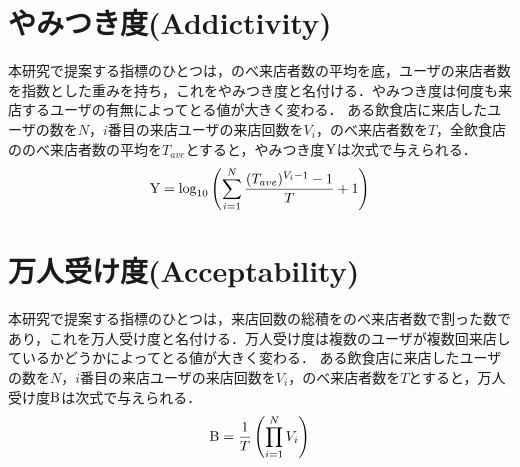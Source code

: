 \section{やみつき度(Addictivity)}

本研究で提案する指標のひとつは，のべ来店者数の平均を底，ユーザの来店者数を指数とした重みを持ち，これをやみつき度と名付ける．やみつき度は何度も来店するユーザの有無によってとる値が大きく変わる．
ある飲食店に来店したユーザの数を$N$，$i$番目の来店ユーザの来店回数を$V_i$，のべ来店者数を$T$，全飲食店ののべ来店者数の平均を$T_{ave}$とすると，やみつき度$\rm Y$は次式で与えられる．
\begin{equation}
	{\rm Y} = \log_{10}{\left(\sum^{N}_{i=1} \frac{(T_{ave})^{V_i-1}-1}{T}+1\right)}
\end{equation}

\section{万人受け度(Acceptability)}

本研究で提案する指標のひとつは，来店回数の総積をのべ来店者数で割った数であり，これを万人受け度と名付ける．万人受け度は複数のユーザが複数回来店しているかどうかによってとる値が大きく変わる．
ある飲食店に来店したユーザの数を$N$，$i$番目の来店ユーザの来店回数を$V_i$，のべ来店者数を$T$とすると，万人受け度$\rm B$は次式で与えられる．
\begin{equation}
	{\rm B} = \frac{1}{T} \left(\prod^N_{i=1}V_i\right)
\end{equation}

